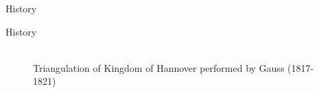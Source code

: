 \documentclass[10pt]{beamer}
\begin{document}
\begin{frame}{History}
\begin{figure}[h]
\begin{minipage}[h]{0.49\linewidth}
		\end{minipage}
	\end{figure}
\end{frame}

\begin{frame}{History}
	\begin{figure}[h]
			\\ Triangulation of Kingdom of Hannover performed by Gauss (1817-1821)
	\end{figure}
\end{frame}
\end{document}
